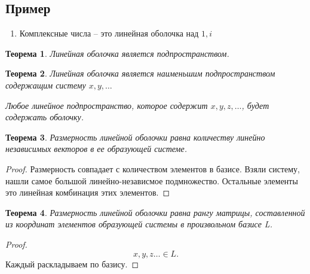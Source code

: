 \documentclass{scrartcl}
\newtheorem{theorem}{Теорема}
\begin{document}
\subsection{Пример}
\begin{enumerate}
    \item Комплексные числа -- это линейная оболочка над $1,i$
\end{enumerate}
\begin{theorem}
    Линейная оболочка является подпространством.
\end{theorem}
\begin{theorem}
    Линейная оболочка является наименьшим подпространством содержащим систему $x,y,\dots$
    
    Любое линейное подпространство, которое содержит $x,y,z,\dots$, будет содержать оболочку.
\end{theorem}
\begin{theorem}
    Размерность линейной оболочки равна количеству линейно независимых векторов в ее образующей системе.
\end{theorem}
\begin{proof}
    Размерность совпадает с количеством элементов в базисе. Взяли систему, нашли самое большой линейно-независмое подмножество. Остальные элементы это линейная комбинация этих элементов.
\end{proof}
\begin{theorem}
    Размерность линейной оболочки равна рангу матрицы, составленной из координат элементов образующей системы в произвольном базисе L.
\end{theorem}
\begin{proof}
    \[
    x,y,z \dots \in L
    .\] 
    Каждый раскладываем по базису.
\end{proof}
\end{document}
